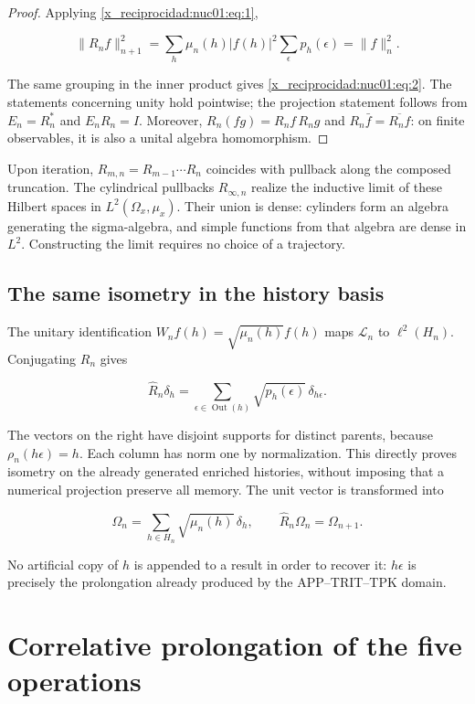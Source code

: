 \begin{proof}
Applying \eqref{x_reciprocidad:nuc01:eq:1},

\[
\|R_nf\|_{n+1}^2
=\sum_h\mu_n(h)|f(h)|^2\sum_\epsilon p_h(\epsilon)
=\|f\|_n^2.
\]

The same grouping in the inner product gives \eqref{x_reciprocidad:nuc01:eq:2}. The statements concerning unity hold pointwise; the projection statement follows from \(E_n=R_n^*\) and \(E_nR_n=I\). Moreover, \(R_n(fg)=R_nf\,R_ng\) and \(R_n\bar f=\overline{R_nf}\): on finite observables, it is also a unital algebra homomorphism.
\end{proof}

Upon iteration, \(R_{m,n}=R_{m-1}\cdots R_n\) coincides with pullback along the composed truncation. The cylindrical pullbacks \(R_{\infty,n}\) realize the inductive limit of these Hilbert spaces in \(L^2(\Omega_x,\mu_x)\). Their union is dense: cylinders form an algebra generating the sigma-algebra, and simple functions from that algebra are dense in \(L^2\). Constructing the limit requires no choice of a trajectory.

\subsection{The same isometry in the history basis}

The unitary identification \(W_nf(h)=\sqrt{\mu_n(h)}f(h)\) maps \(\mathscr L_n\) to \(\ell^2(H_n)\). Conjugating \(R_n\) gives

\begin{equation}
\widehat R_n\delta_h
=\sum_{\epsilon\in\operatorname{Out}(h)}\sqrt{p_h(\epsilon)}\,\delta_{h\epsilon}.
\label{x_reciprocidad:nuc01:eq:3}
\end{equation}

The vectors on the right have disjoint supports for distinct parents, because \(\rho_n(h\epsilon)=h\). Each column has norm one by normalization. This directly proves isometry on the already generated enriched histories, without imposing that a numerical projection preserve all memory. The unit vector is transformed into

\[
\Omega_n=\sum_{h\in H_n}\sqrt{\mu_n(h)}\,\delta_h,
\qquad \widehat R_n\Omega_n=\Omega_{n+1}.
\]

No artificial copy of \(h\) is appended to a result in order to recover it: \(h\epsilon\) is precisely the prolongation already produced by the APP–TRIT–TPK domain.

\section{Correlative prolongation of the five operations}

